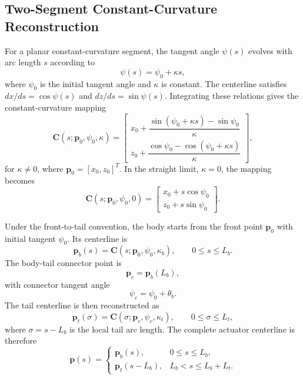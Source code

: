 \subsection{Two-Segment Constant-Curvature Reconstruction}

For a planar constant-curvature segment, the tangent angle $\psi(s)$ evolves with arc length $s$ according to
\begin{equation}
  \psi(s) = \psi_0 + \kappa s,
  \label{eqn:tangent_angle_evolution}
\end{equation}
where $\psi_0$ is the initial tangent angle and $\kappa$ is constant. The centerline satisfies $dx/ds=\cos\psi(s)$ and $dz/ds=\sin\psi(s)$. Integrating these relations gives the constant-curvature mapping
\begin{equation}
  \mathbf{C}(s;\mathbf{p}_0,\psi_0,\kappa)=
  \begin{bmatrix}
    x_0 + \dfrac{\sin(\psi_0+\kappa s)-\sin\psi_0}{\kappa} \\
    z_0 + \dfrac{\cos\psi_0-\cos(\psi_0+\kappa s)}{\kappa}
  \end{bmatrix},
  \label{eqn:constant_curvature_mapping}
\end{equation}
for $\kappa \ne 0$, where $\mathbf{p}_0=[x_0,z_0]^T$. In the straight limit, $\kappa=0$, the mapping becomes
\begin{equation}
  \mathbf{C}(s;\mathbf{p}_0,\psi_0,0)=
  \begin{bmatrix}
    x_0+s\cos\psi_0 \\
    z_0+s\sin\psi_0
  \end{bmatrix}.
  \label{eqn:constant_curvature_straight_limit}
\end{equation}

Under the front-to-tail convention, the body starts from the front point $\mathbf{p}_0$ with initial tangent $\psi_0$. Its centerline is
\begin{equation}
  \mathbf{p}_b(s) =
  \mathbf{C}(s;\mathbf{p}_0,\psi_0,\kappa_b),
  \qquad 0 \le s \le L_b .
  \label{eqn:body_arc}
\end{equation}
The body-tail connector point is
\begin{equation}
  \mathbf{p}_c = \mathbf{p}_b(L_b),
  \label{eqn:connector_point}
\end{equation}
with connector tangent angle
\begin{equation}
  \psi_c = \psi_0 + \theta_b .
  \label{eqn:connector_tangent}
\end{equation}
The tail centerline is then reconstructed as
\begin{equation}
  \mathbf{p}_t(\sigma) =
  \mathbf{C}(\sigma;\mathbf{p}_c,\psi_c,\kappa_t),
  \qquad 0 \le \sigma \le L_t,
  \label{eqn:tail_arc}
\end{equation}
where $\sigma=s-L_b$ is the local tail arc length. The complete actuator centerline is therefore
\begin{equation}
  \mathbf{p}(s)=
  \begin{cases}
    \mathbf{p}_b(s), & 0 \le s \le L_b, \\
    \mathbf{p}_t(s-L_b), & L_b < s \le L_b+L_t .
  \end{cases}
  \label{eqn:full_two_segment_curve}
\end{equation}

